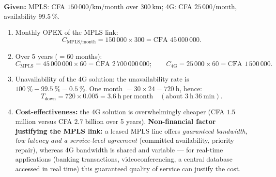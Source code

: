 \documentclass[11pt]{article}
\begin{document}
\begin{corrige}
\textbf{Given:} MPLS: CFA $150\,000$/km/month over $300\ \mathrm{km}$; 4G: CFA $25\,000$/month, availability $99.5\ \%$.
\begin{enumerate}
\item Monthly OPEX of the MPLS link:
\[ C_{\text{MPLS/month}} = 150\,000 \times 300 = \text{CFA }45\,000\,000. \]
\item Over 5 years ($= 60$ months):
\[ C_{\text{MPLS}} = 45\,000\,000 \times 60 = \text{CFA }2\,700\,000\,000; \qquad
C_{\text{4G}} = 25\,000 \times 60 = \text{CFA }1\,500\,000. \]
\item Unavailability of the 4G solution: the unavailability rate is $100\ \% - 99.5\ \% = 0.5\ \%$. One month $= 30 \times 24 = 720\ \mathrm{h}$, hence:
\[ T_{\text{down}} = 720 \times 0.005 = 3.6\ \mathrm{h\ per\ month} \quad (\text{about } 3\ \mathrm{h}\ 36\ \mathrm{min}). \]
\item \textbf{Cost-effectiveness:} the 4G solution is overwhelmingly cheaper (CFA $1.5$ million versus CFA $2.7$ billion over 5 years). \textbf{Non-financial factor justifying the MPLS link:} a leased MPLS line offers \emph{guaranteed bandwidth, low latency and a service-level agreement} (committed availability, priority repair), whereas 4G bandwidth is shared and variable — for real-time applications (banking transactions, videoconferencing, a central database accessed in real time) this guaranteed quality of service can justify the cost.
\end{enumerate}
\end{corrige}
\end{document}
